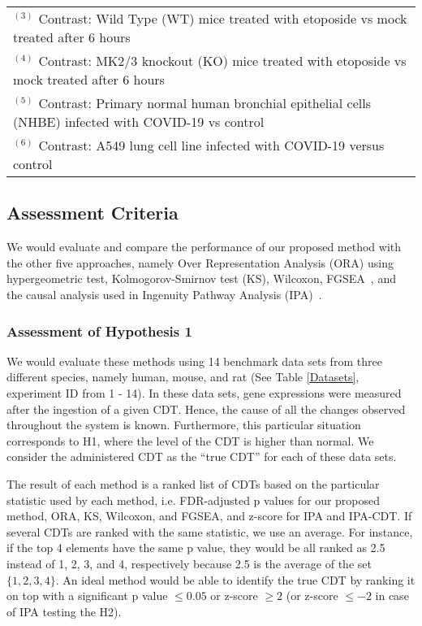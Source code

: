\begin{table}
\begin{center}
\begin{tabular}{ c|cccc }
 \multicolumn{5}{l}{\tiny $^{(3)}$ Contrast: Wild Type (WT) mice treated with etoposide vs mock treated after 6 hours}\\
 \multicolumn{5}{l}{\tiny $^{(4)}$ Contrast: MK2/3 knockout (KO) mice treated with etoposide vs mock treated after 6 hours}\\
 \multicolumn{5}{l}{\tiny $^{(5)}$ Contrast: Primary normal human bronchial epithelial cells (NHBE) infected with COVID-19 vs control}\\
 \multicolumn{5}{l}{\tiny $^{(6)}$ Contrast: A549 lung cell line infected with COVID-19 versus control}\\
\end{tabular}
\end{center}
\end{table}


\subsection{Assessment Criteria}


We would evaluate and compare the performance of our proposed method with the other five approaches, namely Over Representation Analysis (ORA) using hypergeometric test, Kolmogorov-Smirnov test (KS)\cite{massey1951kolmogorov}, Wilcoxon\cite{wilcoxon1945individual}, FGSEA~\cite{korotkevich2021fast}, and the causal analysis used in Ingenuity Pathway Analysis (IPA)~\cite{kramer2013causal}.



\subsubsection{Assessment of Hypothesis 1}
We would evaluate these methods using 14 benchmark data sets from three different species, namely human, mouse, and rat (See Table \ref{Datasets}, experiment ID from 1 - 14). 
In these data sets, gene expressions were measured after the ingestion of a given CDT.
Hence, the cause of all the changes observed  throughout the system is known. Furthermore, this particular situation corresponds to  H1, where the level of the CDT is higher than normal.
We consider the administered CDT as the ``true CDT'' for each of these data sets.

The result of each method is a ranked list of CDTs based on the particular statistic used by each method, i.e. FDR-adjusted p values for our proposed method, ORA, KS, Wilcoxon, and FGSEA, and  z-score  for IPA and IPA-CDT. 
If several CDTs are ranked with the same statistic, we use an average. For instance, if  the top 4 elements have the same p value, they would be all ranked as 2.5 instead of 1, 2, 3, and 4, respectively because 2.5 is the average of the set $\{1, 2, 3, 4\}$.
An ideal method would be able to identify the true CDT by ranking it on top with a significant p value $\leq 0.05$ or  z-score $\geq 2$ (or z-score $\leq -2$ in case of IPA testing the H2).

